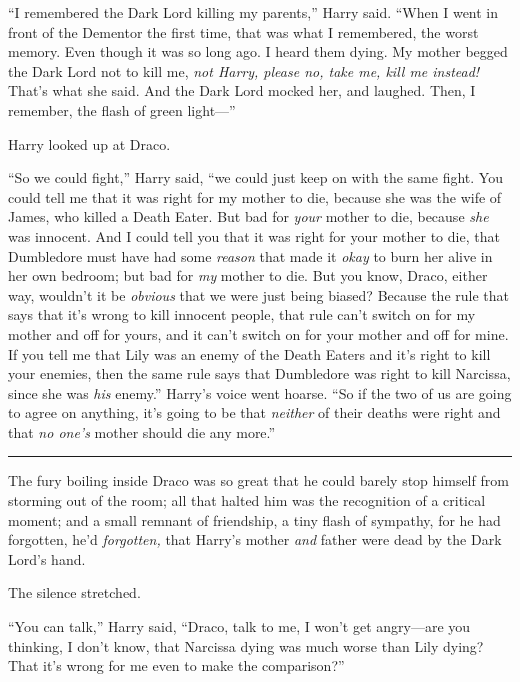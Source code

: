 ``I remembered the Dark Lord killing my parents,'' Harry said. ``When I
went in front of the Dementor the first time, that was what I
remembered, the worst memory. Even though it was so long ago. I heard
them dying. My mother begged the Dark Lord not to kill me, \emph{not
Harry, please no, take me, kill me instead!} That's what she said. And
the Dark Lord mocked her, and laughed. Then, I remember, the flash of
green light---''

Harry looked up at Draco.

``So we could fight,'' Harry said, ``we could just keep on with the same
fight. You could tell me that it was right for my mother to die, because
she was the wife of James, who killed a Death Eater. But bad for
\emph{your} mother to die, because \emph{she} was innocent. And I could
tell you that it was right for your mother to die, that Dumbledore must
have had some \emph{reason} that made it \emph{okay} to burn her alive
in her own bedroom; but bad for \emph{my} mother to die. But you know,
Draco, either way, wouldn't it be \emph{obvious} that we were just being
biased? Because the rule that says that it's wrong to kill innocent
people, that rule can't switch on for my mother and off for yours, and
it can't switch on for your mother and off for mine. If you tell me that
Lily was an enemy of the Death Eaters and it's right to kill your
enemies, then the same rule says that Dumbledore was right to kill
Narcissa, since she was \emph{his} enemy.'' Harry's voice went hoarse.
``So if the two of us are going to agree on anything, it's going to be
that \emph{neither} of their deaths were right and that \emph{no one's}
mother should die any more.''

\begin{center}\rule{3in}{0.4pt}\end{center}

The fury boiling inside Draco was so great that he could barely stop
himself from storming out of the room; all that halted him was the
recognition of a critical moment; and a small remnant of friendship, a
tiny flash of sympathy, for he had forgotten, he'd \emph{forgotten,}
that Harry's mother \emph{and} father were dead by the Dark Lord's hand.

The silence stretched.

``You can talk,'' Harry said, ``Draco, talk to me, I won't get
angry---are you thinking, I don't know, that Narcissa dying was much
worse than Lily dying? That it's wrong for me even to make the
comparison?''

